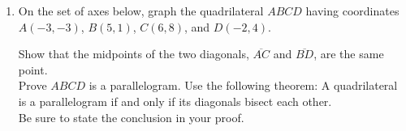 \begin{enumerate}
  \item On the set of axes below, graph the quadrilateral $ABCD$ having coordinates $A(-3,-3)$, $B(5,1)$, $C(6,8)$, and $D(-2,4)$.
    \begin{center} %
    \end{center}
    Show that the midpoints of the two diagonals, $\overline{AC}$ and $\overline{BD}$, are the same point. \\%
    Prove $ABCD$ is a parallelogram. Use the following theorem:
    A quadrilateral is a parallelogram if and only if its diagonals bisect each other. \\[0.5cm]
    Be sure to state the conclusion in your proof.

\end{enumerate}
